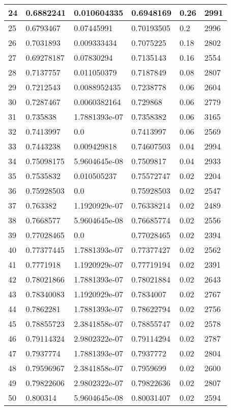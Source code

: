 \begin{longtable}{|l|l|l|l|l|l|}
24 & 0.6882241 & 0.010604335 & 0.6948169 & 0.26 & 2991 \\ \hline 
25 & 0.6793467 & 0.07445991 & 0.70193505 & 0.2 & 2996 \\ \hline 
26 & 0.7031893 & 0.009333434 & 0.7075225 & 0.18 & 2802 \\ \hline 
27 & 0.69278187 & 0.07830294 & 0.7135143 & 0.16 & 2554 \\ \hline 
28 & 0.7137757 & 0.011050379 & 0.7187849 & 0.08 & 2807 \\ \hline 
29 & 0.7212543 & 0.0088952435 & 0.7238778 & 0.06 & 2604 \\ \hline 
30 & 0.7287467 & 0.0060382164 & 0.729868 & 0.06 & 2779 \\ \hline 
31 & 0.735838 & 1.7881393e-07 & 0.7358382 & 0.06 & 3165 \\ \hline 
32 & 0.7413997 & 0.0 & 0.7413997 & 0.06 & 2569 \\ \hline 
33 & 0.7443238 & 0.009429818 & 0.74607503 & 0.04 & 2994 \\ \hline 
34 & 0.75098175 & 5.9604645e-08 & 0.7509817 & 0.04 & 2933 \\ \hline 
35 & 0.7535832 & 0.010505237 & 0.75572747 & 0.02 & 2204 \\ \hline 
36 & 0.75928503 & 0.0 & 0.75928503 & 0.02 & 2547 \\ \hline 
37 & 0.763382 & 1.1920929e-07 & 0.76338214 & 0.02 & 2489 \\ \hline 
38 & 0.7668577 & 5.9604645e-08 & 0.76685774 & 0.02 & 2556 \\ \hline 
39 & 0.77028465 & 0.0 & 0.77028465 & 0.02 & 2394 \\ \hline 
40 & 0.77377445 & 1.7881393e-07 & 0.77377427 & 0.02 & 2562 \\ \hline 
41 & 0.7771918 & 1.1920929e-07 & 0.77719194 & 0.02 & 2391 \\ \hline 
42 & 0.78021866 & 1.7881393e-07 & 0.78021884 & 0.02 & 2643 \\ \hline 
43 & 0.78340083 & 1.1920929e-07 & 0.7834007 & 0.02 & 2767 \\ \hline 
44 & 0.7862281 & 1.7881393e-07 & 0.78622794 & 0.02 & 2756 \\ \hline 
45 & 0.78855723 & 2.3841858e-07 & 0.78855747 & 0.02 & 2578 \\ \hline 
46 & 0.79114324 & 2.9802322e-07 & 0.79114294 & 0.02 & 2787 \\ \hline 
47 & 0.7937774 & 1.7881393e-07 & 0.7937772 & 0.02 & 2804 \\ \hline 
48 & 0.79596967 & 2.3841858e-07 & 0.7959699 & 0.02 & 2600 \\ \hline 
49 & 0.79822606 & 2.9802322e-07 & 0.79822636 & 0.02 & 2807 \\ \hline 
50 & 0.800314 & 5.9604645e-08 & 0.80031407 & 0.02 & 2594 \\ \hline 
\end{longtable}
